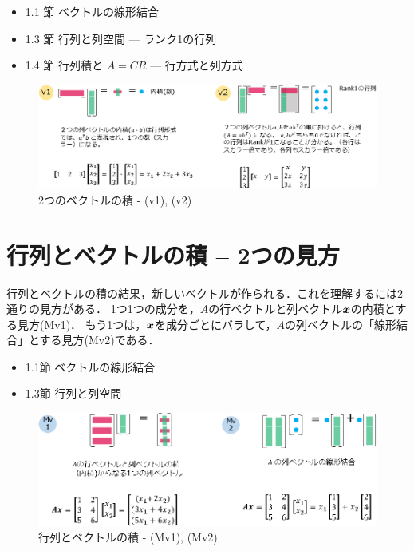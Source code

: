 \documentclass[letterpaper]{article}
\newcommand{\bi}[1]{\hbox{\boldmath$#1$}}
\begin{document}
\begin{itemize}
  \item 1.1 節 ベクトルの線形結合
  \item 1.3 節 行列と列空間 --- ランク1の行列
  \item 1.4 節 行列積と $A=CR$ \; --- 行方式と列方式
\end{itemize} 


\begin{figure}[H]
  \centering
  \includegraphics[keepaspectratio, width=\linewidth]{VectorTimesVector-j.eps}
  \caption{2つのベクトルの積 - (v1), (v2)}
\end{figure}

\section{行列とベクトルの積 -- 2つの見方}

行列とベクトルの積の結果，新しいベクトルが作られる．これを理解するには2通りの見方がある．
1つ1つの成分を，$A$の行ベクトルと列ベクトル$\bi{x}$の内積とする見方(Mv1)．
もう1つは，$\bi{x}$を成分ごとにバラして，$A$の列ベクトルの「線形結合」とする見方(Mv2)である．

\begin{itemize}
  \item 1.1節 ベクトルの線形結合
  \item 1.3節 行列と列空間
\end{itemize} 

\begin{figure}[H]
  \includegraphics[keepaspectratio, width=\linewidth]{MatrixTimesVector-j.eps}
  \caption{行列とベクトルの積 - (Mv1), (Mv2)}
\end{figure}
\end{document}
